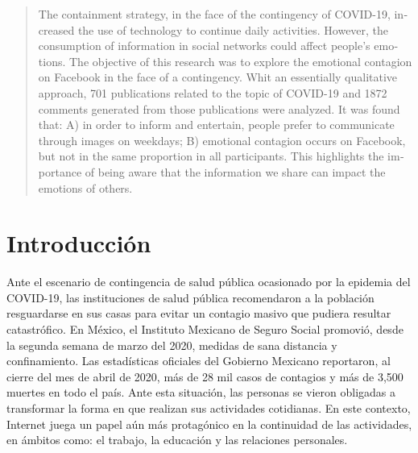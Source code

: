 \documentclass{textolivre}
\begin{document}
\begin{polyabstract}
\begin{portuguese}
\begin{abstract}
\end{abstract}
\end{portuguese}

\begin{english}
\begin{abstract}
The containment strategy, in the face of the contingency of COVID-19, 
increased the use of technology to continue daily activities. 
However, the consumption of information in social networks could affect people's
emotions. The objective of this research was to explore the emotional contagion 
on Facebook in the face of a contingency. Whit an essentially qualitative approach,
701 publications related to the topic of COVID-19 and 1872 comments generated from those publications were analyzed. It was found that: A) in order to inform and entertain, people prefer to communicate through images on weekdays; B) emotional contagion occurs on Facebook, but not in the same proportion in all participants. This highlights the importance of being aware that the information we share can impact the emotions of others.

\end{abstract}
\end{english}

\end{polyabstract}


\section{Introducción}\label{sec-introd}
Ante el escenario de contingencia de salud pública ocasionado por la epidemia del COVID-19, las instituciones de salud pública recomendaron a la población resguardarse en sus casas para evitar un contagio masivo que pudiera resultar catastrófico. En México, el Instituto Mexicano de Seguro Social promovió, desde la segunda semana de marzo del 2020, medidas de sana distancia y confinamiento. Las estadísticas oficiales del Gobierno Mexicano reportaron, al cierre del mes de abril de 2020, más de 28 mil casos de contagios y más de 3,500 muertes en todo el país.  Ante esta situación, las personas se vieron obligadas a transformar la forma en que realizan sus actividades cotidianas. En este contexto, Internet juega un papel aún más protagónico en la continuidad de las actividades, en ámbitos como: el trabajo, la educación y las relaciones personales. 
\end{document}
